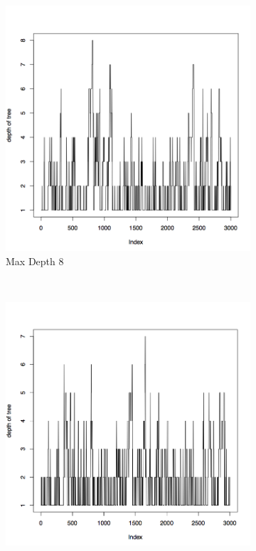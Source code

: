 \documentclass{article}
\begin{document}
\begin{figure}[H]
        \centering
        \begin{subfigure}[b]{0.3\textwidth}
                \centering
                \includegraphics[width=\textwidth]{depth_c8}
                \caption{Max Depth 8}
                \label{fig:gull}
        \end{subfigure}%
        ~ %
        \begin{subfigure}[b]{0.3\textwidth}
                \centering
                \includegraphics[width=\textwidth]{depth_c9}

\end{subfigure}
\end{figure}
\end{document}

